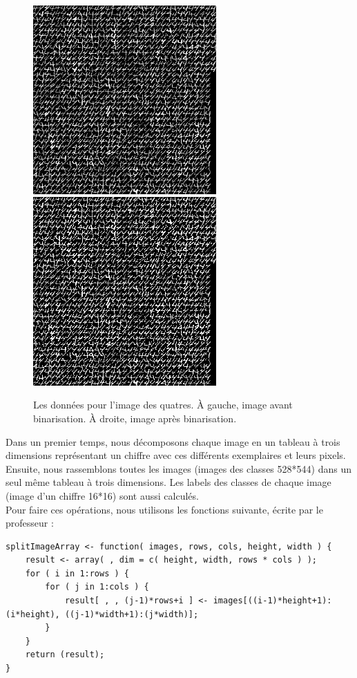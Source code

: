\documentclass[a4paper,11pt]{article}
\begin{document}
  \begin{figure}[H]
    \centering
    \includegraphics[width=7cm]{usps_4.jpg}
    \includegraphics[width=7cm]{usps_4.png}
    \caption{Les données pour l'image des quatres. À gauche, image avant binarisation. À droite, image après binarisation.}
  \end{figure}
  
  Dans un premier temps, nous décomposons chaque image en un tableau à trois dimensions 
  représentant un chiffre avec ces différents exemplaires et leurs pixels. Ensuite, nous
  rassemblons toutes les images (images des classes 528*544) dans un seul même tableau à trois dimensions.
  Les labels des classes de chaque image (image d'un chiffre 16*16) sont aussi calculés.\\
  
  Pour faire ces opérations, nous utilisons les fonctions suivante, écrite par le professeur : 
  
  \begin{lstlisting}[caption=Fonction de décomposition de la base]
splitImageArray <- function( images, rows, cols, height, width ) {
    result <- array( , dim = c( height, width, rows * cols ) );
    for ( i in 1:rows ) {
        for ( j in 1:cols ) {
            result[ , , (j-1)*rows+i ] <- images[((i-1)*height+1):(i*height), ((j-1)*width+1):(j*width)];
        }
    }
    return (result);
}
  \end{lstlisting}
  
\end{document}
